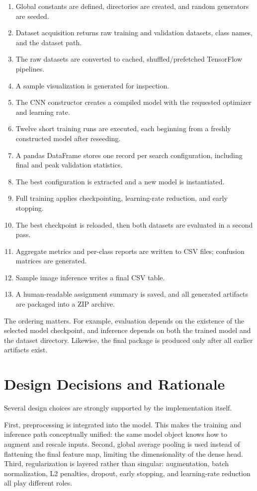 \documentclass[11pt,a4paper]{article}
\begin{document}
\begin{enumerate}[leftmargin=1.7em]
\item Global constants are defined, directories are created, and random generators are seeded.
\item Dataset acquisition returns raw training and validation datasets, class names, and the dataset path.
\item The raw datasets are converted to cached, shuffled/prefetched TensorFlow pipelines.
\item A sample visualization is generated for inspection.
\item The CNN constructor creates a compiled model with the requested optimizer and learning rate.
\item Twelve short training runs are executed, each beginning from a freshly constructed model after reseeding.
\item A pandas DataFrame stores one record per search configuration, including final and peak validation statistics.
\item The best configuration is extracted and a new model is instantiated.
\item Full training applies checkpointing, learning-rate reduction, and early stopping.
\item The best checkpoint is reloaded, then both datasets are evaluated in a second pass.
\item Aggregate metrics and per-class reports are written to CSV files; confusion matrices are generated.
\item Sample image inference writes a final CSV table.
\item A human-readable assignment summary is saved, and all generated artifacts are packaged into a ZIP archive.
\end{enumerate}

The ordering matters. For example, evaluation depends on the existence of the selected model checkpoint, and inference depends on both the trained model and the dataset directory. Likewise, the final package is produced only after all earlier artifacts exist.

\section{Design Decisions and Rationale}
Several design choices are strongly supported by the implementation itself.

First, preprocessing is integrated into the model. This makes the training and inference path conceptually unified: the same model object knows how to augment and rescale inputs. Second, global average pooling is used instead of flattening the final feature map, limiting the dimensionality of the dense head. Third, regularization is layered rather than singular: augmentation, batch normalization, L2 penalties, dropout, early stopping, and learning-rate reduction all play different roles.
\end{document}
